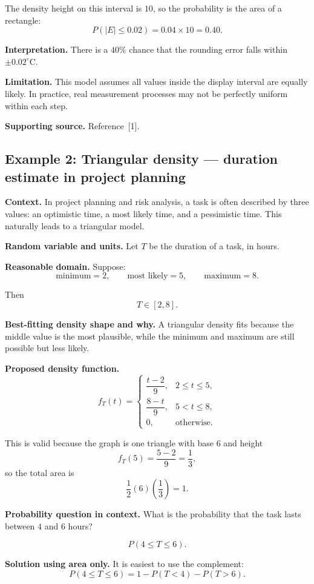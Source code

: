 \documentclass[11pt]{article}
\begin{document}
	The density height on this interval is $10$, so the probability is the area of a rectangle:
	\[
	P(|E|\le 0.02)=0.04\times 10=0.40.
	\]
	
	\textbf{Interpretation.} There is a $40\%$ chance that the rounding error falls within $\pm 0.02^\circ\text{C}$.
	
	\textbf{Limitation.} This model assumes all values inside the display interval are equally likely. In practice, real measurement processes may not be perfectly uniform within each step.
	
	\textbf{Supporting source.} Reference \,[1].
	
	\subsection{Example 2: Triangular density --- duration estimate in project planning}
	
	\textbf{Context.} In project planning and risk analysis, a task is often described by three values: an optimistic time, a most likely time, and a pessimistic time. This naturally leads to a triangular model.
	
	\textbf{Random variable and units.} Let $T$ be the duration of a task, in hours.
	
	\textbf{Reasonable domain.} Suppose:
	\[
	\text{minimum}=2,\qquad \text{most likely}=5,\qquad \text{maximum}=8.
	\]
	
	Then
	\[
	T\in[2,8].
	\]
	
	\textbf{Best-fitting density shape and why.} A triangular density fits because the middle value is the most plausible, while the minimum and maximum are still possible but less likely.
	
	\textbf{Proposed density function.}
	\[
	f_T(t)=
	\begin{cases}
		\dfrac{t-2}{9}, & 2\le t\le 5,\\[6pt]
		\dfrac{8-t}{9}, & 5<t\le 8,\\
		0, & \text{otherwise}.
	\end{cases}
	\]
	
	This is valid because the graph is one triangle with base $6$ and height
	\[
	f_T(5)=\frac{5-2}{9}=\frac13,
	\]
	so the total area is
	\[
	\frac12(6)\left(\frac13\right)=1.
	\]
	
	\textbf{Probability question in context.} What is the probability that the task lasts between $4$ and $6$ hours?
	
	\[
	P(4\le T\le 6).
	\]
	
	\textbf{Solution using area only.} It is easiest to use the complement:
	\[
	P(4\le T\le 6)=1-P(T<4)-P(T>6).
	\]
	
\end{document}
